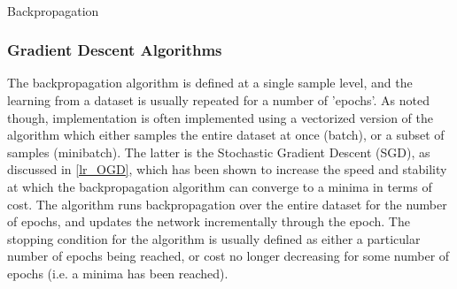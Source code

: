 \documentclass[a4paper,latin]{paper}
\begin{document}
\begin{algorithm}[H]
	
	\texttt{\\}


	\label{algo_backprop}
	\caption{Backpropagation}
\end{algorithm}




\subsubsection{Gradient Descent Algorithms}\label{imp_sgd}

The backpropagation algorithm is defined at a single sample level, and the learning from a dataset is usually repeated for a number of 'epochs'. As noted though, implementation is often implemented using a vectorized version of the algorithm which either samples the entire dataset at once (batch), or a subset of samples (minibatch). The latter is the Stochastic Gradient Descent (SGD), as discussed in \ref{lr_OGD}, which has been shown to increase the speed and stability at which the backpropagation algorithm can converge to a minima in terms of cost. The algorithm runs backpropagation over the entire dataset for the number of epochs, and updates the network incrementally through the epoch. The stopping condition for the algorithm is usually defined as either a particular number of epochs being reached, or cost no longer decreasing for some number of epochs (i.e. a minima has been reached).\newline
\end{document}
